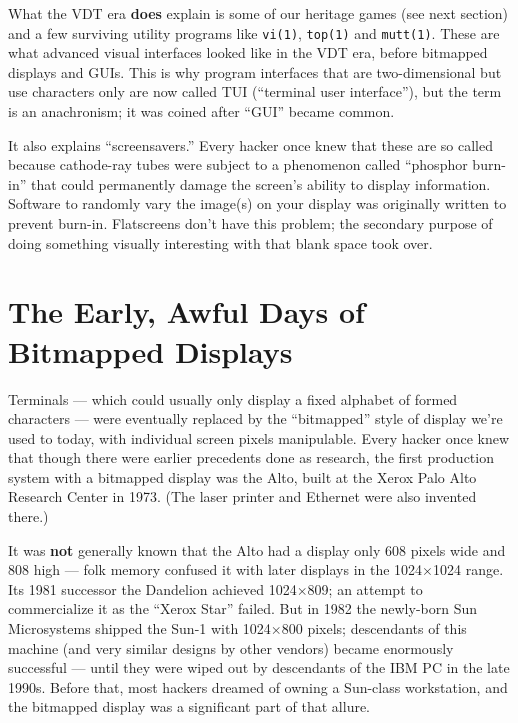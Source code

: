 \documentclass[12pt,letterpaper]{article}
\newcommand{\prog}[1]{\texttt{#1}}
\newcommand{\strong}[1]{\textbf{#1}}
\newcommand{\mc}{\small}
\newcommand{\acro}[1]{{\mc #1\spacefactor1000}}
\begin{document}
What the \acro{VDT} era \textbf{does} explain is some of our heritage games (see next section)
and a few surviving utility programs like \prog{vi(1)}, \prog{top(1)} and \prog{mutt(1)}. These are
what advanced visual interfaces looked like in the \acro{VDT} era, before bitmapped
displays and \acro{GUI}s. This is why program interfaces that are two-dimensional but
use characters only are now called \acro{TUI} (``terminal user interface''), but the
term is an anachronism; it was coined after ``\acro{GUI}'' became common.

It also explains ``screensavers.'' Every hacker once knew that these are so
called because cathode-ray tubes were subject to a phenomenon called ``phosphor
burn-in'' that could permanently damage the screen's ability to display
information. Software to randomly vary the image(s) on your display was
originally written to prevent burn-in. Flatscreens don't have this problem; the
secondary purpose of doing something visually interesting with that blank space
took over.

\section[The Early, Awful Days of Bitmapped Displays]{The Early, Awful Days of\\ Bitmapped Displays}
Terminals --- which could usually only display a fixed alphabet of formed
characters --- were eventually replaced by the ``bitmapped'' style of display we're
used to today, with individual screen pixels manipulable. Every hacker once
knew that though there were earlier precedents done as research, the first
production system with a bitmapped display was the Alto, built at the Xerox
Palo Alto Research Center in 1973. (The laser printer and Ethernet were also
invented there.)

It was \strong{not} generally known that the Alto had a display only 608 pixels wide and
808 high --- folk memory confused it with later displays in the 1024$\times$1024 range.
Its 1981 successor the Dandelion achieved 1024$\times$809; an attempt to commercialize
it as the ``Xerox Star'' failed. But in 1982 the newly-born Sun Microsystems
shipped the Sun-1 with 1024$\times$800 pixels; descendants of this machine (and very
similar designs by other vendors) became enormously successful --- until they
were wiped out by descendants of the \acro{IBM PC} in the late 1990s. Before that,
most hackers dreamed of owning a Sun-class workstation, and the bitmapped
display was a significant part of that allure.
\end{document}
